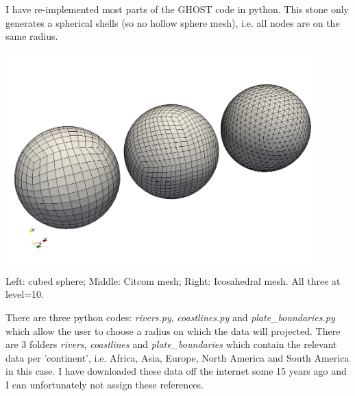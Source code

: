

I have re-implemented most parts of the GHOST code \cite{thie18} in python. 
This stone only generates a spherical shells (so no hollow sphere mesh), 
i.e. all nodes are on the same radius. 

\begin{center}
\includegraphics[width=12cm]{python_codes/fieldstone_69/images/shells}\\
{\captionfont Left: cubed sphere; Middle: Citcom mesh; Right: Icosahedral mesh. 
All three at level=10.}
\end{center}



There are three python codes: {\sl rivers.py}, {\sl coastlines.py} and {\sl plate\_boundaries.py} which allow the user to choose 
a radius on which the data will projected. There are 3 folders {\sl rivers}, {\sl coastlines} and {\sl plate\_boundaries} which contain the relevant data per 'continent', i.e. 
Africa, Asia, Europe, North America and South America in this case. 
I have downloaded these data off the internet some 15 years ago and I can unfortunately not assign these references.

